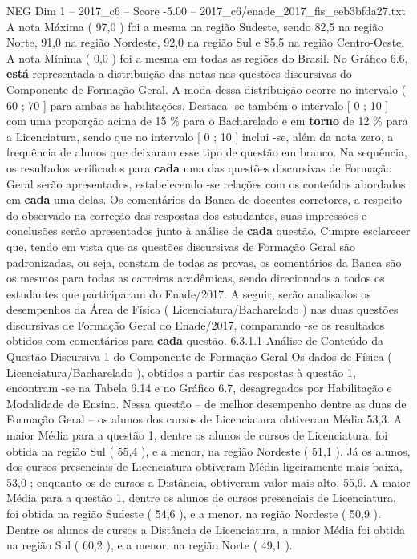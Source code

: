 \begin{textsample}{NEG Dim 1 – 2017\_c6 – Score -5.00 – 2017\_c6/enade\_2017\_fis\_eeb3bfda27.txt}
A nota Máxima ( 97,0 ) foi a mesma na região Sudeste, sendo 82,5 na região Norte, 91,0 na região Nordeste, 92,0 na região Sul e 85,5 na região Centro-Oeste.
A nota Mínima ( 0,0 ) foi a mesma em todas as regiões do Brasil.
No Gráfico 6.6, \textbf{está} representada a distribuição das notas nas questões discursivas do Componente de Formação Geral.
A moda dessa distribuição ocorre no intervalo ( 60 ; 70 ] para ambas as habilitações.
Destaca -se também o intervalo [ 0 ; 10 ] com uma proporção acima de 15 \% para o Bacharelado e em \textbf{torno} de 12 \% para a Licenciatura, sendo que no intervalo [ 0 ; 10 ] inclui -se, além da nota zero, a frequência de alunos que deixaram esse tipo de questão em branco.
Na sequência, os resultados verificados para \textbf{cada} uma das questões discursivas de Formação Geral serão apresentados, estabelecendo -se relações com os conteúdos abordados em \textbf{cada} uma delas.
Os comentários da Banca de docentes corretores, a respeito do observado na correção das respostas dos estudantes, suas impressões e conclusões serão apresentados junto à análise de \textbf{cada} questão.
Cumpre esclarecer que, tendo em vista que as questões discursivas de Formação Geral são padronizadas, ou seja, constam de todas as provas, os comentários da Banca são os mesmos para todas as carreiras acadêmicas, sendo direcionados a todos os estudantes que participaram do Enade/2017.
A seguir, serão analisados os desempenhos da Área de Física ( Licenciatura/Bacharelado ) nas duas questões discursivas de Formação Geral do Enade/2017, comparando -se os resultados obtidos com comentários para \textbf{cada} questão. 6.3.1.1 Análise de Conteúdo da Questão Discursiva 1 do Componente de Formação Geral Os dados de Física ( Licenciatura/Bacharelado ), obtidos a partir das respostas à questão 1, encontram -se na Tabela 6.14 e no Gráfico 6.7, desagregados por Habilitação e Modalidade de Ensino.
Nessa questão – de melhor desempenho dentre as duas de Formação Geral – os alunos dos cursos de Licenciatura obtiveram Média 53,3.
A maior Média para a questão 1, dentre os alunos de cursos de Licenciatura, foi obtida na região Sul ( 55,4 ), e a menor, na região Nordeste ( 51,1 ).
Já os alunos, dos cursos presenciais de Licenciatura obtiveram Média ligeiramente mais baixa, 53,0 ; enquanto os de cursos a Distância, obtiveram valor mais alto, 55,9.
A maior Média para a questão 1, dentre os alunos de cursos presenciais de Licenciatura, foi obtida na região Sudeste ( 54,6 ), e a menor, na região Nordeste ( 50,9 ).
Dentre os alunos de cursos a Distância de Licenciatura, a maior Média foi obtida na região Sul ( 60,2 ), e a menor, na região Norte ( 49,1 ).

\end{textsample}
